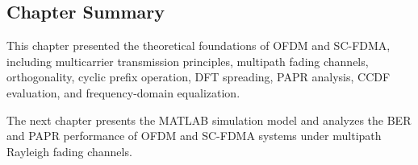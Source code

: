 \subsection{Chapter Summary}

This chapter presented the theoretical foundations of OFDM and SC-FDMA,
including multicarrier transmission principles, multipath fading channels,
orthogonality, cyclic prefix operation, DFT spreading, PAPR analysis,
CCDF evaluation, and frequency-domain equalization.

The next chapter presents the MATLAB simulation model and analyzes the BER
and PAPR performance of OFDM and SC-FDMA systems under multipath Rayleigh
fading channels.